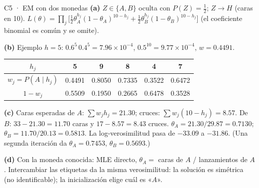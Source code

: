 \begin{solucion}{C5 · EM con dos monedas}
\textbf{(a)} $Z\in\{A,B\}$ oculta con $P(Z)=\frac12$; $Z\to H$ (caras en 10). $L(\theta)=\prod_j\big[\tfrac12\theta_A^{h_j}(1-\theta_A)^{10-h_j}+\tfrac12\theta_B^{h_j}(1-\theta_B)^{10-h_j}\big]$
(el coeficiente binomial es común y se omite).

\textbf{(b)} Ejemplo $h=5$: $0.6^5\,0.4^5=7.96\times10^{-4}$, $0.5^{10}=9.77\times10^{-4}$, $w=0.4491$.
\begin{center}\small
\begin{tabular}{c|ccccc}
$h_j$ & 5 & 9 & 8 & 4 & 7\\\hline
$w_j=P(A\mid h_j)$ & 0.4491 & 0.8050 & 0.7335 & 0.3522 & 0.6472\\
$1-w_j$ & 0.5509 & 0.1950 & 0.2665 & 0.6478 & 0.3528
\end{tabular}
\end{center}

\textbf{(c)} Caras esperadas de $A$: $\sum w_jh_j=21.30$; cruces: $\sum w_j(10-h_j)=8.57$. De $B$: $33-21.30=11.70$ caras y $17-8.57=8.43$ cruces.
$\theta_A=21.30/29.87=\mathbf{0.7130}$; $\theta_B=11.70/20.13=\mathbf{0.5813}$.
La log-verosimilitud pasa de $-33.09$ a $-31.86$. (Una segunda iteración da $\theta_A=0.7453$, $\theta_B=0.5693$.)

\textbf{(d)} Con la moneda conocida: MLE directo, $\theta_A=$ caras de $A$ / lanzamientos de $A$. Intercambiar las etiquetas da la misma
verosimilitud: la solución es simétrica (no identificable); la inicialización elige cuál es «$A$».
\end{solucion}

